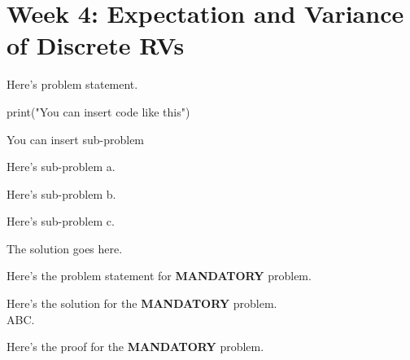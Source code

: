 \documentclass[a4paper, 10pt]{article}
\begin{document}
\subject[2110205 - Statistics for Computer Engineering]


\section{Week 4: Expectation and Variance of Discrete RVs}



\begin{problem}
Here's problem statement.
\begin{codingbox}
print("You can insert code like this")
\end{codingbox}
You can insert sub-problem
\begin{subproblems}
    \item Here's sub-problem a.
    \item Here's sub-problem b.
    \item Here's sub-problem c.
\end{subproblems}
\end{problem}

\begin{solution}
The solution goes here.
\end{solution}


\begin{tosubmit}
\problem
Here's the problem statement for \textbf{MANDATORY} problem.

\par\noindent\submitsolution
Here's the solution for the \textbf{MANDATORY} problem. \\
ABC.

\proof
Here's the proof for the \textbf{MANDATORY} problem.
\end{tosubmit}
\end{document}
